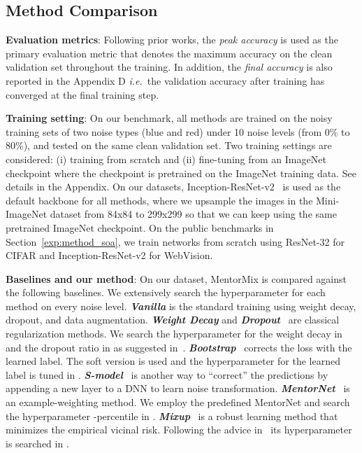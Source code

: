 \documentclass{article}
\newcommand{\ie}{\emph{i.e.}} \newcommand{\Ie}{\emph{I.e}}
\begin{document}
\subsection{Method Comparison}\label{sec:exp_method}

\noindent\textbf{Evaluation metrics}: Following prior works, the \emph{peak accuracy} is used as the primary evaluation metric that denotes the maximum accuracy on the clean validation set throughout the training. In addition, the \emph{final accuracy} is also reported in the Appendix D \ie~the validation accuracy after training has converged at the final training step.

\noindent\textbf{Training setting}: On our benchmark, all methods are trained on the noisy training sets of two noise types (blue and red) under 10 noise levels (from 0\% to 80\%), and tested on the same clean validation set. Two training settings are considered: (i) training from scratch and (ii) fine-tuning from an ImageNet checkpoint where the checkpoint is pretrained on the ImageNet training data. See details in the Appendix. On our datasets, Inception-ResNet-v2~\citep{szegedy2017inception} is used as the default backbone for all methods, where we upsample the images in the Mini-ImageNet dataset from 84x84 to 299x299 so that we can keep using the same pretrained ImageNet checkpoint. On the public benchmarks in Section~\ref{exp:method_soa}, we train networks from scratch using ResNet-32 for CIFAR and Inception-ResNet-v2 for WebVision.

\noindent\textbf{Baselines and our method}: On our dataset, MentorMix is compared against the following baselines. 
We extensively search the hyperparameter for each method on every noise level.
\textit{\textbf{Vanilla}} is the standard training using  weight decay, dropout, and data augmentation. \textit{\textbf{Weight Decay}} and \textit{\textbf{Dropout}}~\citep{srivastava2014dropout} are classical regularization methods. We search the hyperparameter for the weight decay in  and the dropout ratio in  as suggested in~\citep{arpit2017closer}. \textbf{\emph{Bootstrap}}~\citep{reed2014training} corrects the loss with the learned label. The soft version is used and the hyperparameter for the learned label is tuned in . \textit{\textbf{S-model}}~\citep{goldberger2017training} is another way to ``correct'' the predictions by appending a new layer to a DNN to learn noise transformation. \textit{\textbf{MentorNet}}~\citep{jiang2018mentornet} is an example-weighting method. We employ the predefined MentorNet and search the hyperparameter -percentile in . \textit{\textbf{Mixup}}~\citep{zhang2018mixup} is a robust learning method that minimizes the empirical vicinal risk. Following the advice in~\citep{zhang2018mixup} its hyperparameter  is searched in .
\end{document}
